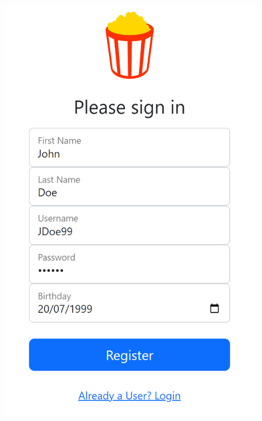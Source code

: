\begin{center}
\includegraphics[scale=0.45]{../../../images/user_manual/user_registration.png} 
\end{center}
\vspace{5pt}

